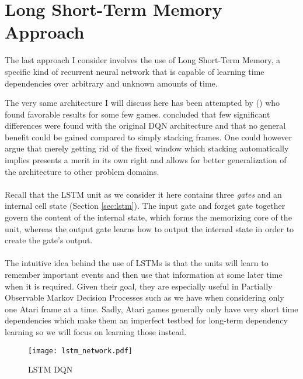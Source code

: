 \section{Long Short-Term Memory Approach}
\label{sec:long_short_term_memory_approach}
The last approach I consider involves
the use of Long Short-Term Memory,
a specific kind of recurrent neural network
that is capable of learning time dependencies
over arbitrary and unknown amounts of time.

The very same architecture I will discuss here
has been attempted by
\citeauthor{Hausknecht2015} (\citeyear{Hausknecht2015})
who found favorable results for some few games.
\citeauthor{Hausknecht2015}
concluded that few significant differences
were found with the original DQN architecture
and that no general benefit could be gained compared
to simply stacking frames.
One could however argue
that merely getting rid of the fixed window
which stacking automatically implies
presents a merit in its own right
and allows for better generalization of the architecture
to other problem domains.

\paragraph{}
Recall that the LSTM unit as we consider it here
contains three \textit{gates}
and an internal cell state (Section \ref{sec:lstm}).
The input gate and forget gate together govern
the content of the internal state,
which forms the memorizing core of the unit,
whereas the output gate
learns how to output the internal state
in order to create the gate's output.

\paragraph{}
The intuitive idea behind the use of LSTMs
is that the units will learn to remember important events
and then use that information at some later time
when it is required.
Given their goal,
they are especially useful in Partially Observable Markov Decision Processes
such as we have when considering only one Atari frame at a time.
Sadly, Atari games generally only have very short time dependencies
which make them an imperfect testbed for
long-term dependency learning
so we will focus on learning those instead.

\begin{figure}[htpb]
  \centering
  \texttt{[image: lstm\_network.pdf]}
  \caption{LSTM DQN}
  \label{fig:lstm_network}
\end{figure}

